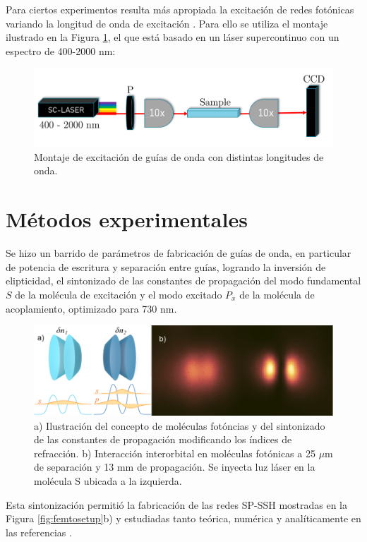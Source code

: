 \documentclass[12pt, letterpaper]{article}
\begin{document}
Para ciertos experimentos resulta más apropiada la excitación de redes fotónicas variando la longitud de onda de excitación \cite{spectraltransfer, SPSSH}. Para ello se utiliza el montaje ilustrado en la Figura \ref{fig:supercontinuum}, el que está basado en un láser supercontinuo con un espectro de 400-2000 nm:

\begin{figure}[H]
	\centering
	\includegraphics[width=0.5\linewidth]{./media/supercontinuum.png}
	\caption{Montaje de excitación de guías de onda con distintas longitudes de onda.\label{fig:supercontinuum}}
\end{figure}


\section{Métodos experimentales}

Se hizo un barrido de parámetros de fabricación de guías de onda, en particular de potencia de escritura y separación entre guías, logrando la inversión de elipticidad, el sintonizado de las constantes de propagación del modo fundamental $S$ de la molécula de excitación y el modo excitado $P_x$ de la molécula de acoplamiento, optimizado para 730 nm.


\begin{figure}[H]
	\centering
	\includegraphics[width=0.7\linewidth]{./media/detuningv2.png}
	\caption{a) Ilustración del concepto de moléculas fotóncias y del sintonizado de las constantes de propagación modificando los índices de refracción. b) Interacción interorbital en moléculas fotónicas a 25 $\mu$m de separación y 13 mm de propagación. Se inyecta luz láser en la molécula S ubicada a la izquierda.}
\end{figure}

Esta sintonización permitió la fabricación de las redes SP-SSH mostradas en la Figura \ref{fig:femtosetup}b) y estudiadas tanto teórica, numérica y analíticamente en las referencias \cite{toporusos, topo1dphoto, SPSSH}.
\end{document}
